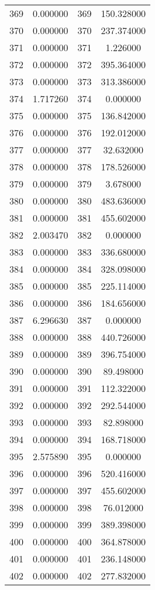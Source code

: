 \documentclass[12pt]{article}
\begin{document}
\begin{longtable}{@{}cccc@{}}
369 & 0.000000 & 369 & 150.328000 \\
370 & 0.000000 & 370 & 237.374000 \\
371 & 0.000000 & 371 & 1.226000 \\
372 & 0.000000 & 372 & 395.364000 \\
373 & 0.000000 & 373 & 313.386000 \\
374 & 1.717260 & 374 & 0.000000 \\
375 & 0.000000 & 375 & 136.842000 \\
376 & 0.000000 & 376 & 192.012000 \\
377 & 0.000000 & 377 & 32.632000 \\
378 & 0.000000 & 378 & 178.526000 \\
379 & 0.000000 & 379 & 3.678000 \\
380 & 0.000000 & 380 & 483.636000 \\
381 & 0.000000 & 381 & 455.602000 \\
382 & 2.003470 & 382 & 0.000000 \\
383 & 0.000000 & 383 & 336.680000 \\
384 & 0.000000 & 384 & 328.098000 \\
385 & 0.000000 & 385 & 225.114000 \\
386 & 0.000000 & 386 & 184.656000 \\
387 & 6.296630 & 387 & 0.000000 \\
388 & 0.000000 & 388 & 440.726000 \\
389 & 0.000000 & 389 & 396.754000 \\
390 & 0.000000 & 390 & 89.498000 \\
391 & 0.000000 & 391 & 112.322000 \\
392 & 0.000000 & 392 & 292.544000 \\
393 & 0.000000 & 393 & 82.898000 \\
394 & 0.000000 & 394 & 168.718000 \\
395 & 2.575890 & 395 & 0.000000 \\
396 & 0.000000 & 396 & 520.416000 \\
397 & 0.000000 & 397 & 455.602000 \\
398 & 0.000000 & 398 & 76.012000 \\
399 & 0.000000 & 399 & 389.398000 \\
400 & 0.000000 & 400 & 364.878000 \\
401 & 0.000000 & 401 & 236.148000 \\
402 & 0.000000 & 402 & 277.832000 \\

\end{longtable}
\end{document}
